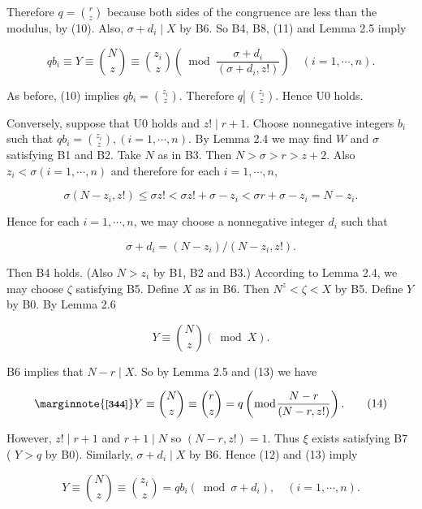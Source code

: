 \documentclass[11pt,a4paper]{article}
\newcommand{\origpage}[1]{\marginnote{\footnotesize\textbf{[#1]}}}
\begin{document}
Therefore $q=\binom{r}{z}$ because both sides of the congruence are less than the modulus, by (10). Also, $\sigma+d_{i} \mid X$ by B6. So B4, B8, (11) and Lemma 2.5 imply

$$
q b_{i} \equiv Y \equiv\binom{N}{z} \equiv\binom{z_{i}}{z}\left(\bmod \frac{\sigma+d_{i}}{\left(\sigma+d_{i}, z!\right)}\right) \quad(i=1, \cdots, n) .
$$

As before, (10) implies $q b_{i}=\binom{z_{i}}{z}$. Therefore $q \left\lvert\,\binom{ z_{i}}{z}\right.$. Hence U0 holds.

Conversely, suppose that U0 holds and $z!\mid r+1$. Choose nonnegative integers $b_{i}$ such that $q b_{i}=\binom{z_{i}}{z},(i=1, \cdots, n)$. By Lemma 2.4 we may find $W$ and $\sigma$ satisfying B1 and B2. Take $N$ as in B3. Then $N>\sigma>r>z+2$. Also $z_{i}<\sigma(i=1, \cdots, n)$ and therefore for each $i=1, \cdots, n$,

$$
\sigma\left(N-z_{i}, z!\right) \leq \sigma z!<\sigma z!+\sigma-z_{i}<\sigma r+\sigma-z_{i}=N-z_{i} .
$$

Hence for each $i=1, \cdots, n$, we may choose a nonnegative integer $d_{i}$ such that


\begin{equation*}
\sigma+d_{i}=\left(N-z_{i}\right) /\left(N-z_{i}, z!\right) . \tag{12}
\end{equation*}


Then B4 holds. (Also $N>z_{i}$ by B1, B2 and B3.) According to Lemma 2.4, we may choose $\zeta$ satisfying B5. Define $X$ as in B6. Then $N^{z}<\zeta<X$ by B5. Define $Y$ by B0. By Lemma 2.6


\begin{equation*}
Y \equiv\binom{N}{z}(\bmod X) . \tag{13}
\end{equation*}


B6 implies that $N-r \mid X$. So by Lemma 2.5 and (13) we have


\begin{equation*}
\origpage{344}Y \equiv\binom{N}{z} \equiv\binom{r}{z}=q\left(\bmod \frac{N-r}{(N-r, z!)}\right) . \tag{14}
\end{equation*}


However, $z!\mid r+1$ and $r+1 \mid N$ so $(N-r, z!)=1$. Thus $\xi$ exists satisfying B7 ( $Y>q$ by B0). Similarly, $\sigma+d_i\mid X$ by B6. Hence (12) and (13) imply

$$
Y \equiv\binom{N}{z} \equiv\binom{z_{i}}{z}=q b_{i}\left(\bmod \sigma+d_{i}\right), \quad(i=1, \cdots, n) .
$$
\end{document}
